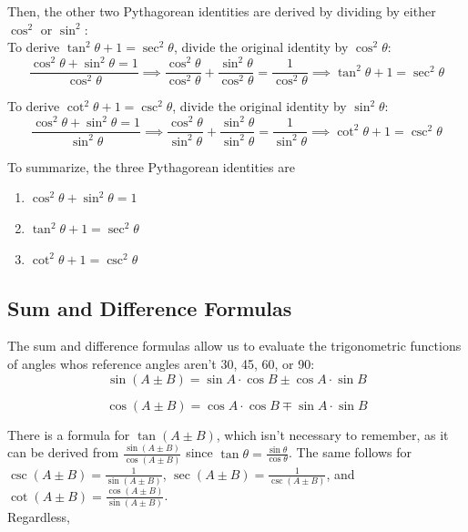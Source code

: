\documentclass[12pt]{article}
\begin{document}
Then, the other two Pythagorean identities are derived by dividing by either \(\cos^2\) or \(\sin^2\):\\

To derive \(\tan^2\theta+1=\sec^2\theta\), divide the original identity by \(\cos^2\theta\):\\

\[\frac{\cos^2\theta + \sin^2\theta = 1}{\cos^2\theta}\implies\frac{\cos^2\theta}{\cos^2\theta}+\frac{\sin^2\theta}{\cos^2\theta}=\frac{1}{\cos^2\theta}\implies\tan^2\theta+1=\sec^2\theta\]

To derive \(\cot^2\theta+1=\csc^2\theta\), divide the original identity by \(\sin^2\theta\):\\

\[\frac{\cos^2\theta + \sin^2\theta = 1}{\sin^2\theta}\implies\frac{\cos^2\theta}{\sin^2\theta}+\frac{\sin^2\theta}{\sin^2\theta}=\frac{1}{\sin^2\theta}\implies\cot^2\theta+1=\csc^2\theta\]

To summarize, the three Pythagorean identities are 

\begin{enumerate}
	\item \(\cos^2\theta + \sin^2\theta = 1\)
	\item \(\tan^2\theta+1=\sec^2\theta\)
	\item  \(\cot^2\theta+1=\csc^2\theta\)
\end{enumerate}

\subsection{Sum and Difference Formulas}

The sum and difference formulas allow us to evaluate the trigonometric functions of angles whos reference angles aren't 30, 45, 60, or 90:\\

\[\sin(A\pm B)=\sin A\cdot\cos B \pm \cos A\cdot\sin B\]

\[\cos(A\pm B)=\cos A\cdot\cos B \mp \sin A\cdot\sin B\]

There is a formula for \(\tan(A\pm B)\), which isn't necessary to remember, as it can be derived from \(\frac{\sin(A\pm B)}{\cos(A\pm B)}\) since \(\tan\theta=\frac{\sin\theta}{\cos\theta}\). The same follows for \(\csc(A\pm B)=\frac{1}{\sin(A\pm B)}\), \(\sec(A\pm B)=\frac{1}{\csc(A\pm B)}\), and \(\cot(A\pm B)=\frac{\cos(A\pm B)}{\sin(A\pm B)}\).\\

Regardless, \\
\end{document}
